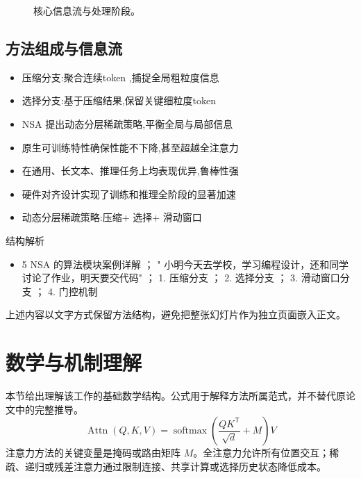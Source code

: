 \documentclass[UTF8,11pt,a4paper]{ctexart}
\begin{document}
\begin{figure}[H]
\centering
{}
\caption{核心信息流与处理阶段。}
\end{figure}

\subsection{方法组成与信息流}
\begin{itemize}
\item 压缩分支:聚合连续token ,捕捉全局粗粒度信息
\item 选择分支:基于压缩结果,保留关键细粒度token
\item NSA 提出动态分层稀疏策略,平衡全局与局部信息
\item 原生可训练特性确保性能不下降,甚至超越全注意力
\item 在通用、长文本、推理任务上均表现优异,鲁棒性强
\item 硬件对齐设计实现了训练和推理全阶段的显著加速
\item 动态分层稀疏策略:压缩+ 选择+ 滑动窗口
\end{itemize}

\begin{keybox}{结构解析}
\begin{itemize}
\item 5 NSA 的算法模块案例详解 ； " 小明今天去学校，学习编程设计，还和同学讨论了作业，明天要交代码" ； 1. 压缩分支 ； 2. 选择分支 ； 3. 滑动窗口分支 ； 4. 门控机制
\end{itemize}
\end{keybox}

上述内容以文字方式保留方法结构，避免把整张幻灯片作为独立页面嵌入正文。

\section{数学与机制理解}
本节给出理解该工作的基础数学结构。公式用于解释方法所属范式，并不替代原论文中的完整推导。
\begin{equation}
\operatorname{Attn}(Q,K,V)=\operatorname{softmax}\!\left(\frac{QK^{\mathsf T}}{\sqrt d}+M\right)V
\end{equation}
注意力方法的关键变量是掩码或路由矩阵 $M$。全注意力允许所有位置交互；稀疏、递归或残差注意力通过限制连接、共享计算或选择历史状态降低成本。
\end{document}
